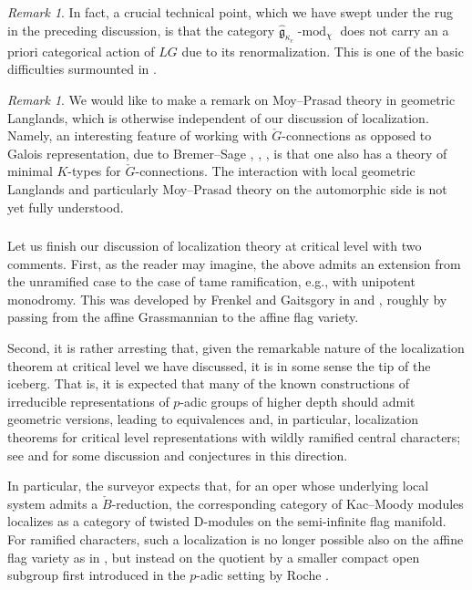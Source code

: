 \documentclass[10pt]{amsart}
\newcommand{\fgc}{\widehat{\fg}_{\kappa_c}}
\newcommand{\cB}{\check{B}}
\newcommand{\fg}{\mathfrak{g}}
\newcommand{\on}{\operatorname}
\renewcommand{\mod}{\on{-mod}}
\theoremstyle{remark}
\newtheorem{re}[subsubsection]{Remark}
\numberwithin{equation}{section}
\newcommand{\cG}{\check{G}}
\renewcommand{\mod}{\operatorname{-mod}}
\begin{document}
	\begin{re}In fact, a crucial technical point, which we have swept under the rug in the preceding discussion, is that the category $\fgc\mod_\chi$ does not carry an a priori categorical action of $LG$  due to its renormalization. This is one of the basic difficulties surmounted in \cite{RaskinYang}.
	\end{re}
	
	
	\begin{re} We would like to make a remark on Moy--Prasad theory in geometric Langlands, which is otherwise independent of our discussion of localization. Namely, an interesting feature of working with $\cG$-connections as opposed to Galois representation, due to Bremer--Sage \cite{sage1}, \cite{sage2}, \cite{sage3}, is that one also has a theory of minimal $K$-types for $\cG$-connections. The interaction with local geometric Langlands and particularly Moy--Prasad theory on the automorphic side is not yet fully understood. 	\end{re}
	
	
	\subsubsection{} Let us finish our discussion of localization theory at critical level with two comments. 
	First, as the reader may imagine, the above admits an extension from the 
	unramified case to the case of tame ramification, e.g.,  with unipotent 
	monodromy. This was developed by Frenkel and Gaitsgory in \cite{fg06loc} and \cite{fglocaff}, roughly by passing from the affine Grassmannian to the affine 
	flag variety. 
	
	
	Second, it is rather arresting that, given the remarkable nature of the localization theorem at critical level we have discussed, it is in some sense the tip of the iceberg. That	is, it is expected that many of the known constructions of irreducible representations of $p$-adic 
	groups of higher depth should admit geometric versions, leading to equivalences and,  in 
	particular, localization theorems for  critical level representations 
	with 
	wildly ramified central characters; see \cite{fg06loc} and \cite{kamgarpourschedler} for some discussion and conjectures in this direction. 
	
	In particular, the surveyor expects that, for an oper whose underlying local system admits a $\cB$-reduction, the corresponding category of Kac--Moody modules localizes as a category of twisted D-modules on the semi-infinite flag manifold. For ramified characters, such a localization is no longer possible also on the affine flag variety as in \cite{fglocaff}, but instead on the quotient by a smaller compact open subgroup first introduced in the $p$-adic setting by Roche \cite{roche}. 
	
\end{document}
